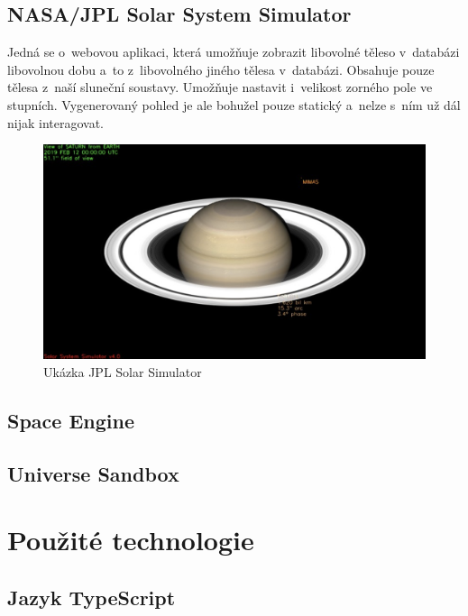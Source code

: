 \documentclass[a4paper,12pt]{article}
\begin{document}
\subsection{NASA/JPL Solar System Simulator}

Jedná se o~webovou aplikaci, která umožňuje zobrazit libovolné těleso v~databázi libovolnou dobu a~to z~libovolného jiného tělesa v~databázi. Obsahuje pouze tělesa z~naší sluneční soustavy. Umožňuje nastavit i~velikost zorného pole ve stupních. Vygenerovaný pohled je ale bohužel pouze statický a~nelze s~ním už dál nijak interagovat.

\begin{figure}[H]
  \centering
  \includegraphics[width=450pt]{Images/JPLNasa.png}
  \caption[Ukázka JPL Solar System Simulator]{Ukázka JPL Solar Simulator   \footnotemark[1]}
\end{figure}


\subsection{Space Engine}
\subsection{Universe Sandbox}


\section{Použité technologie}

\subsection{Jazyk TypeScript}
\end{document}
